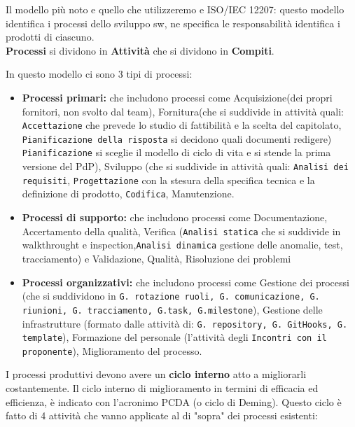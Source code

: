 Il modello più noto e quello che utilizzeremo e ISO/IEC 12207: questo modello identifica i processi dello sviluppo sw, ne specifica le responsabilità identifica i prodotti di ciascuno.
\\
\textbf{Processi} si dividono in \textbf{Attività} che si dividono in \textbf{Compiti}.

In questo modello ci sono 3 tipi di processi:
\begin{itemize}
	\item \textbf{Processi primari:} che includono processi come Acquisizione(dei propri fornitori, non svolto dal team), Fornitura(che si suddivide in attività quali: \texttt{Accettazione} che prevede lo studio di fattibilità e la scelta del capitolato, \texttt{Pianificazione della risposta} si decidono quali documenti redigere) \texttt{Pianificazione} si sceglie il modello di ciclo di vita e si stende la prima versione del PdP), Sviluppo (che si suddivide in attività quali: \texttt{Analisi dei requisiti}, \texttt{Progettazione} con la stesura della specifica tecnica e la definizione di prodotto, \texttt{Codifica}, Manutenzione.
	\item\textbf{Processi di supporto:} che includono processi come Documentazione, Accertamento della qualità, Verifica (\texttt{Analisi statica} che si suddivide in walkthrought e inspection,\texttt{Analisi dinamica} gestione delle anomalie, test, tracciamento) e Validazione, Qualità, Risoluzione dei problemi
	\item \textbf{Processi organizzativi:} che includono processi come Gestione dei processi (che si suddividono in \texttt{G. rotazione ruoli, G. comunicazione, G. riunioni, G. tracciamento, G.task, G.milestone}), Gestione delle infrastrutture (formato dalle attività di: \texttt{G. repository, G. GitHooks, G. template}), Formazione del personale (l'attività degli \texttt{Incontri con il proponente}), Miglioramento del processo.
\end{itemize}

I processi produttivi devono avere un \textbf{ciclo interno} atto a migliorarli costantemente. Il ciclo interno di miglioramento in termini di efficacia ed efficienza, è indicato con l'acronimo PCDA (o ciclo di Deming). Questo ciclo è fatto di 4 attività che vanno applicate al di "sopra" dei processi esistenti:

